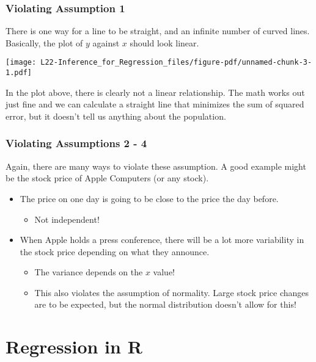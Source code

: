 \documentclass[
  letterpaper,
  DIV=11,
  numbers=noendperiod]{scrreprt}
\providecommand{\tightlist}{%
  \setlength{\itemsep}{0pt}\setlength{\parskip}{0pt}}\usepackage{longtable,booktabs,array}
\begin{document}
\hypertarget{violating-assumption-1}{%
\subsubsection{Violating Assumption 1}\label{violating-assumption-1}}

There is one way for a line to be straight, and an infinite number of
curved lines. Basically, the plot of \(y\) against \(x\) should look
linear.

\texttt{[image: L22-Inference\_for\_Regression\_files/figure-pdf/unnamed-chunk-3-1.pdf]}

In the plot above, there is clearly not a linear relationship. The math
works out just fine and we can calculate a straight line that minimizes
the sum of squared error, but it doesn't tell us anything about the
population.

\hypertarget{violating-assumptions-2---4}{%
\subsubsection{Violating Assumptions 2 -
4}\label{violating-assumptions-2---4}}

Again, there are many ways to violate these assumption. A good example
might be the stock price of Apple Computers (or any stock).

\begin{itemize}
\tightlist
\item
  The price on one day is going to be close to the price the day before.

  \begin{itemize}
  \tightlist
  \item
    Not independent!
  \end{itemize}
\item
  When Apple holds a press conference, there will be a lot more
  variability in the stock price depending on what they announce.

  \begin{itemize}
  \tightlist
  \item
    The variance depends on the \(x\) value!
  \item
    This also violates the assumption of normality. Large stock price
    changes are to be expected, but the normal distribution doesn't
    allow for this!
  \end{itemize}
\end{itemize}

\hypertarget{regression-in-r}{%
\section{Regression in R}\label{regression-in-r}}
\end{document}
